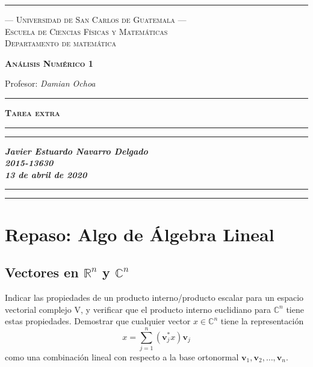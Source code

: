 \documentclass[12pt]{book}
\newcommand\BackImage[2][scale=1]{%
\BgThispage
\backgroundsetup{
  contents={\texttt{[image: \#2]}}
  }
}
\newcommand{\C}{\mathbb{C}}
\newcommand{\R}{\mathbb{R}}
\begin{document}
\thispagestyle{empty}
\vfill
\begin{center}
\hrule
\vspace{0.2cm}
\large{\textsc{--- Universidad de San Carlos de Guatemala ---}}\\
\large{\textsc{Escuela de Ciencias Físicas y Matemáticas}}\\
\large{\textsc{Departamento de matemática}}\\
\begin{large}
\textsc{\textbf{Análisis Numérico 1}}\\
\end{large}
Profesor: \textit{Damian Ochoa}\\
\vspace{0.2cm}
\hrule
\end{center}
\BackImage[width=0.8\textwidth]{img}
\vfill
\begin{center}
\Large{\textsc{\textbf{Tarea extra}}}\\
\end{center}
\vfill
\begin{center}
\hrule
\vspace{0.07cm}
\hrule
\vspace{0.2cm}
\begin{flushright}
\begin{large}
\textit{\textbf{Javier Estuardo Navarro Delgado}}\\
\textit{\textbf{2015-13630}}\\
\textit{\textbf{13 de abril de 2020}}\\
\end{large}
\end{flushright}
\vspace{0.2cm}
\hrule
\vspace{0.07cm}
\hrule
\vspace{1cm}
\end{center}
\tableofcontents
\chapter{Repaso: Algo de Álgebra Lineal}
\section{Vectores en $\R^n$ y $\C^n$}
\exercise Indicar las propiedades de un producto interno/producto escalar para un espacio vectorial complejo V, y verificar que el producto interno euclidiano para $\C^n$ tiene estas propiedades.
\exercise Demostrar que cualquier vector $x\in\C^n$ tiene la representación
\[ x = \sum^n_{j=1}(\textbf{v}^*_jx)\textbf{v}_j\]
como una combinación lineal con respecto a la base ortonormal $\textbf{v}_1, \textbf{v}_2, \dots, \textbf{v}_n$.
\end{document}
